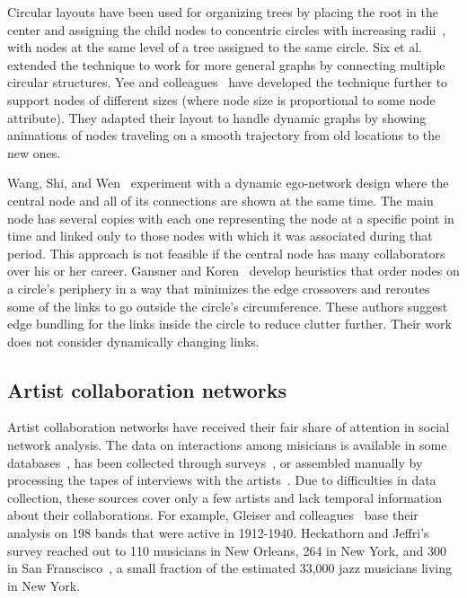 \documentclass[12pt]{cmuthesis}
\begin{document}
  Circular layouts have been used for organizing trees by placing the root in the center and assigning the child nodes to concentric circles with increasing radii~\cite{North1997}, with nodes at the same level of a tree assigned to the same circle. Six et al.~\cite{Six1999} extended the technique to work for more general graphs by connecting multiple circular structures. Yee and colleagues~\cite{Yee2001} have developed the technique further to support nodes of different sizes (where node size is proportional to some node attribute). They adapted their layout to handle dynamic graphs by showing animations of nodes traveling on a smooth trajectory from old locations to the new ones.

  Wang, Shi, and Wen~\cite{Wang2011a} experiment with a dynamic ego-network design where the central node and all of its connections are shown at the same time. The main node has several copies with each one representing the node at a specific point in time and linked only to those nodes with which it was associated during that period. This approach is not feasible if the central node has many collaborators over his or her career. Gansner and Koren~\cite{Gansner2006} develop heuristics that order nodes on a circle's periphery in a way that minimizes the edge crossovers and reroutes some of the links to go outside the circle's circumference. These authors suggest edge bundling for the links inside the circle to reduce clutter further. Their work does not consider dynamically changing links.

  \subsection{Artist collaboration networks}

  Artist collaboration networks have received their fair share of attention in social network analysis. The data on interactions among misicians is available in some databases~\cite{Gleiser2003,Pattuelli2012}, has been collected through surveys~\cite{Heckathorn2001a}, or assembled manually by processing the tapes of interviews with the artists~\cite{Pattuelli2011}. Due to difficulties in data collection, these sources cover only a few artists and lack temporal information about their collaborations. For example, Gleiser and colleagues~\cite{Gleiser2003} base their analysis on 198 bands that were active in 1912-1940. Heckathorn and Jeffri's survey reached out to 110 musicians in New Orleans, 264 in New York, and 300 in San Franscisco~\cite{Heckathorn2001a}, a small fraction of the estimated 33,000 jazz musicians living in New York.
\end{document}
